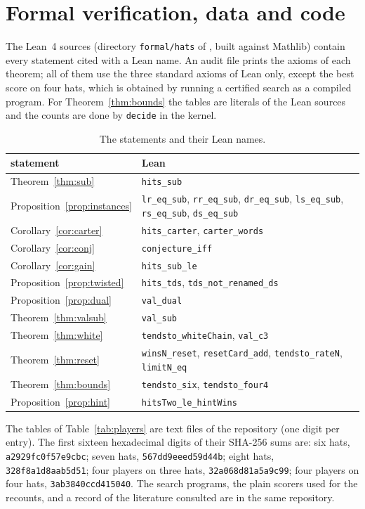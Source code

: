 \documentclass[11pt,a4paper]{article}
\theoremstyle{definition}
\theoremstyle{remark}
\newcommand{\lean}[1]{\texttt{#1}}
\begin{document}
\section{Formal verification, data and code}\label{sec:lean}

The Lean~4 sources (directory \texttt{formal/hats} of \cite{web}, built
against Mathlib) contain every statement cited with a Lean name. An
audit file prints the axioms of each theorem; all of them use the three
standard axioms of Lean only, except the best score on four hats, which
is obtained by running a certified search as a compiled program. For
Theorem~\ref{thm:bounds} the tables are literals of the Lean sources and
the counts are done by \texttt{decide} in the kernel.

\begin{table}[ht]
\centering
\small
\begin{tabular}{@{}ll@{}}
\toprule
statement & Lean \\
\midrule
Theorem~\ref{thm:sub} & \lean{hits\_sub} \\
Proposition~\ref{prop:instances} & \lean{lr\_eq\_sub}, \lean{rr\_eq\_sub},
  \lean{dr\_eq\_sub}, \lean{ls\_eq\_sub}, \lean{rs\_eq\_sub},
  \lean{ds\_eq\_sub} \\
Corollary~\ref{cor:carter} & \lean{hits\_carter}, \lean{carter\_words} \\
Corollary~\ref{cor:conj} & \lean{conjecture\_iff} \\
Corollary~\ref{cor:gain} & \lean{hits\_sub\_le} \\
Proposition~\ref{prop:twisted} & \lean{hits\_tds},
  \lean{tds\_not\_renamed\_ds} \\
Proposition~\ref{prop:dual} & \lean{val\_dual} \\
Theorem~\ref{thm:valsub} & \lean{val\_sub} \\
Theorem~\ref{thm:white} & \lean{tendsto\_whiteChain}, \lean{val\_c3} \\
Theorem~\ref{thm:reset} & \lean{winsN\_reset}, \lean{resetCard\_add},
  \lean{tendsto\_rateN}, \lean{limitN\_eq} \\
Theorem~\ref{thm:bounds} & \lean{tendsto\_six}, \lean{tendsto\_four4} \\
Proposition~\ref{prop:hint} & \lean{hitsTwo\_le\_hintWins} \\
\bottomrule
\end{tabular}
\caption{The statements and their Lean names.}
\end{table}

The tables of Table~\ref{tab:players} are text files of the repository
(one digit per entry). The first sixteen hexadecimal digits of their
SHA-256 sums are: six hats, \texttt{a2929fc0f57e9cbc}; seven hats,
\texttt{567dd9eeed59d44b}; eight hats, \texttt{328f8a1d8aab5d51}; four
players on three hats, \texttt{32a068d81a5a9c99}; four players on four
hats, \texttt{3ab3840ccd415040}. The search programs, the plain scorers
used for the recounts, and a record of the literature consulted are in
the same repository.
\end{document}

